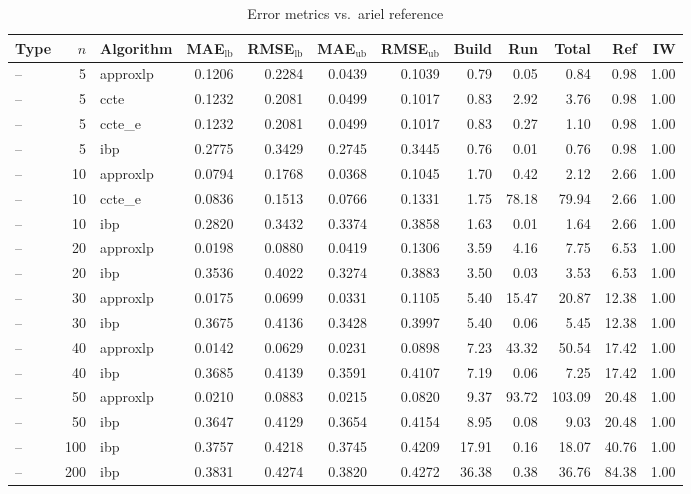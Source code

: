 \begin{table}[ht]
\centering
\scriptsize
\caption{Error metrics vs.\ ariel reference}
\begin{tabular}{lrlrrrrrrrrr}
\toprule
Type & $n$ & Algorithm & MAE$_{\text{lb}}$ & RMSE$_{\text{lb}}$ & MAE$_{\text{ub}}$ & RMSE$_{\text{ub}}$ & Build & Run & Total & Ref & IW \\
\midrule
-- & 5 & approxlp & 0.1206 & 0.2284 & 0.0439 & 0.1039 & 0.79 & 0.05 & 0.84 & 0.98 & 1.00 \\
-- & 5 & ccte & 0.1232 & 0.2081 & 0.0499 & 0.1017 & 0.83 & 2.92 & 3.76 & 0.98 & 1.00 \\
-- & 5 & ccte_e & 0.1232 & 0.2081 & 0.0499 & 0.1017 & 0.83 & 0.27 & 1.10 & 0.98 & 1.00 \\
-- & 5 & ibp & 0.2775 & 0.3429 & 0.2745 & 0.3445 & 0.76 & 0.01 & 0.76 & 0.98 & 1.00 \\
-- & 10 & approxlp & 0.0794 & 0.1768 & 0.0368 & 0.1045 & 1.70 & 0.42 & 2.12 & 2.66 & 1.00 \\
-- & 10 & ccte_e & 0.0836 & 0.1513 & 0.0766 & 0.1331 & 1.75 & 78.18 & 79.94 & 2.66 & 1.00 \\
-- & 10 & ibp & 0.2820 & 0.3432 & 0.3374 & 0.3858 & 1.63 & 0.01 & 1.64 & 2.66 & 1.00 \\
-- & 20 & approxlp & 0.0198 & 0.0880 & 0.0419 & 0.1306 & 3.59 & 4.16 & 7.75 & 6.53 & 1.00 \\
-- & 20 & ibp & 0.3536 & 0.4022 & 0.3274 & 0.3883 & 3.50 & 0.03 & 3.53 & 6.53 & 1.00 \\
-- & 30 & approxlp & 0.0175 & 0.0699 & 0.0331 & 0.1105 & 5.40 & 15.47 & 20.87 & 12.38 & 1.00 \\
-- & 30 & ibp & 0.3675 & 0.4136 & 0.3428 & 0.3997 & 5.40 & 0.06 & 5.45 & 12.38 & 1.00 \\
-- & 40 & approxlp & 0.0142 & 0.0629 & 0.0231 & 0.0898 & 7.23 & 43.32 & 50.54 & 17.42 & 1.00 \\
-- & 40 & ibp & 0.3685 & 0.4139 & 0.3591 & 0.4107 & 7.19 & 0.06 & 7.25 & 17.42 & 1.00 \\
-- & 50 & approxlp & 0.0210 & 0.0883 & 0.0215 & 0.0820 & 9.37 & 93.72 & 103.09 & 20.48 & 1.00 \\
-- & 50 & ibp & 0.3647 & 0.4129 & 0.3654 & 0.4154 & 8.95 & 0.08 & 9.03 & 20.48 & 1.00 \\
-- & 100 & ibp & 0.3757 & 0.4218 & 0.3745 & 0.4209 & 17.91 & 0.16 & 18.07 & 40.76 & 1.00 \\
-- & 200 & ibp & 0.3831 & 0.4274 & 0.3820 & 0.4272 & 36.38 & 0.38 & 36.76 & 84.38 & 1.00 \\
\bottomrule
\end{tabular}
\end{table}
